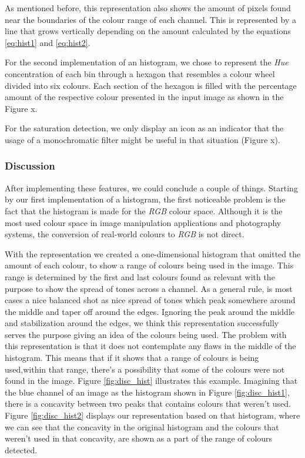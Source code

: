 As mentioned before, this representation also shows the amount of pixels found near the boundaries of the colour range of each channel. This is represented by a line that grows vertically depending on the amount calculated by the equations \ref{eq:hist1} and \ref{eq:hist2}.


For the second implementation of an histogram, we chose to represent the \emph{Hue} concentration of each bin through a hexagon that resembles a colour wheel divided into six colours. Each section of the hexagon is filled with the percentage amount of the respective colour presented in the input image as shown in the Figure x.

For the saturation detection, we only display an icon as an indicator that the usage of a monochromatic filter might be useful in that situation (Figure x).


\subsubsection{Discussion}

After implementing these features, we could conclude a couple of things. Starting by our first implementation of a histogram, the first noticeable problem is the fact that the histogram is made for the \emph{RGB} colour space. Although it is the most used colour space in image manipulation applications and photography systems, the conversion of real-world colours to \emph{RGB} is not direct.

With the representation we created a one-dimensional histogram that omitted the amount of each colour, to show a range of colours being used in the image. This range is determined by the first and last colours found as relevant with the purpose to show the spread of tones across a channel. As a general rule, is most cases a nice balanced shot as nice spread of tones which peak somewhere around the middle and taper off around the edges. Ignoring the peak around the middle and stabilization around the edges, we think this representation successfully serves the purpose giving an idea of the colours being used. The problem with this representation is that it does not contemplate any flaws in the middle of the histogram. This means that if it shows that a range of colours is being used,within that range, there's a possibility that some of the colours were not found in the image. Figure \ref{fig:disc_hist} illustrates this example. Imagining that the blue channel of an image as the histogram shown in Figure \ref{fig:disc_hist1}, there is a concavity between two peaks that contains colours that weren't used. Figure \ref{fig:disc_hist2} displays our representation based on that histogram, where we can see that the concavity in the original histogram and the colours that weren't used in that concavity, are shown as a part of the range of colours detected.

